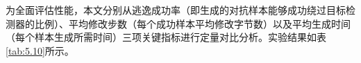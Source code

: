 


为全面评估性能，本文分别从逃逸成功率（即生成的对抗样本能够成功绕过目标检测器的比例）、平均修改步数（每个成功样本平均修改字节数）以及平均生成时间（每个样本生成所需时间）三项关键指标进行定量对比分析。实验结果如表\ref{tab:5.10}所示。


